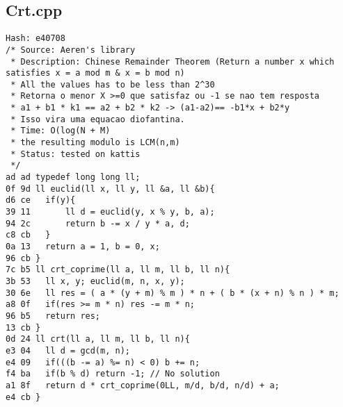 \documentclass[11pt, a4paper, twoside]{article}
\begin{document}
\subsection{Crt.cpp}
\begin{lstlisting}
Hash: e40708
/* Source: Aeren's library
 * Description: Chinese Remainder Theorem (Return a number x which satisfies x = a mod m & x = b mod n)
 * All the values has to be less than 2^30
 * Retorna o menor X >=0 que satisfaz ou -1 se nao tem resposta
 * a1 + b1 * k1 == a2 + b2 * k2 -> (a1-a2)== -b1*x + b2*y
 * Isso vira uma equacao diofantina.
 * Time: O(log(N + M)
 * the resulting modulo is LCM(n,m)
 * Status: tested on kattis
 */
ad ad typedef long long ll;
0f 9d ll euclid(ll x, ll y, ll &a, ll &b){
d6 ce 	if(y){
39 11 		ll d = euclid(y, x % y, b, a);
94 2c 		return b -= x / y * a, d;
c8 cb 	}
0a 13 	return a = 1, b = 0, x;
96 cb }
7c b5 ll crt_coprime(ll a, ll m, ll b, ll n){
3b 53 	ll x, y; euclid(m, n, x, y);
30 6e 	ll res = ( a * (y + m) % m ) * n + ( b * (x + n) % n ) * m;
a8 0f 	if(res >= m * n) res -= m * n;
96 b5 	return res;
13 cb }
0d 24 ll crt(ll a, ll m, ll b, ll n){
e3 04 	ll d = gcd(m, n);
e4 09 	if(((b -= a) %= n) < 0) b += n;
f4 ba 	if(b % d) return -1; // No solution
a1 8f 	return d * crt_coprime(0LL, m/d, b/d, n/d) + a;
e4 cb }
\end{lstlisting}
\end{document}
